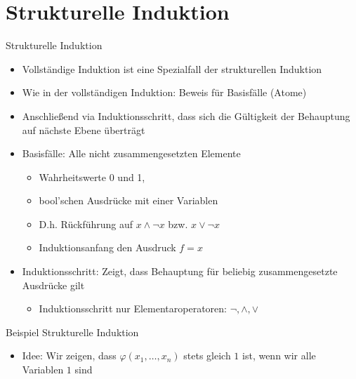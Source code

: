 \documentclass[12pt%
,aspectratio=169%
]{beamer}
\begin{document}
\section{Strukturelle Induktion}
\begin{frame}{Strukturelle Induktion}
\begin{itemize}
	\item Vollständige Induktion ist eine Spezialfall der strukturellen Induktion
	\item Wie in der vollständigen Induktion: Beweis für Basisfälle (Atome)
	\item Anschließend via Induktionsschritt, dass sich die Gültigkeit der Behauptung auf nächste Ebene überträgt
	\item Basisfälle: Alle nicht zusammengesetzten Elemente
	\begin{itemize}
		\item Wahrheitswerte 0 und 1,
		\item bool'schen Ausdrücke mit einer Variablen
		\item D.h. Rückführung auf $x \land \neg x$ bzw. $x \lor \neg x$
		\item Induktionsanfang den Ausdruck $f = x$
	\end{itemize}
	\item Induktionsschritt: Zeigt, dass Behauptung für beliebig zusammengesetzte Ausdrücke gilt
	\begin{itemize}
		\item Induktionsschritt nur Elementaroperatoren: $\neg, \land, \lor$
	\end{itemize}
\end{itemize}
\end{frame}

\begin{frame}{Beispiel Strukturelle Induktion}
\begin{itemize}
\begin{theorem}
	Sei $\varphi$ ein beliebiger boolescher Ausdruck, in dem neben den Variablen $x_1,\ldots , x_n$ ausschließlich der Implikationsoperator vorkommt.\\
	Dann ist $\varphi$ stets erfüllbar.
	\end{theorem}
	\item Idee: Wir zeigen, dass $\varphi(x_1,\ldots, x_n)$ stets gleich $1$ ist, wenn wir alle Variablen $1$ sind
\end{itemize}
\end{frame}
\end{document}
